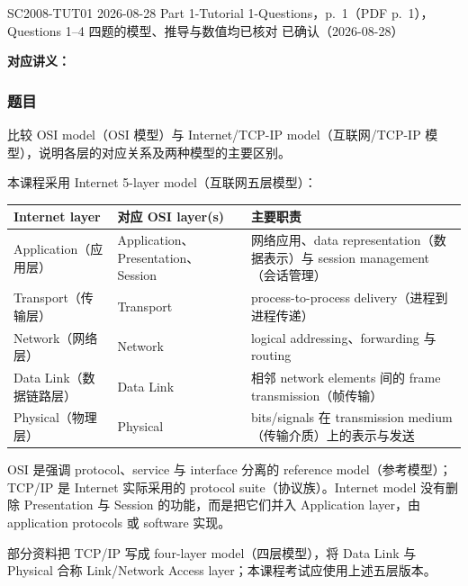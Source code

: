 
\label{tutorial:SC2008-TUT01}

\tutorialmeta
  {SC2008-TUT01}
  {2026-08-28}
  {Part 1-Tutorial 1-Questions，p.~1（PDF p.~1），Questions 1--4}
  {四题的模型、推导与数值均已核对}
  {已确认（2026-08-28）}


\textbf{对应讲义：}

\subsubsection*{题目}

比较 OSI model（OSI 模型）与 Internet/TCP-IP model（互联网/TCP-IP 模型），说明各层的对应关系及两种模型的主要区别。

\begin{checkedsolution}
本课程采用 Internet 5-layer model（互联网五层模型）：
\begin{center}
\small
\begin{tabularx}{0.94\textwidth}{@{}>{\raggedright\arraybackslash}p{3.3cm}>{\raggedright\arraybackslash}p{4.2cm}X@{}}
  \toprule
  Internet layer & 对应 OSI layer(s) & 主要职责 \\
  \midrule
  Application（应用层） & Application、Presentation、Session & 网络应用、data representation（数据表示）与 session management（会话管理） \\
  Transport（传输层） & Transport & process-to-process delivery（进程到进程传递） \\
  Network（网络层） & Network & logical addressing、forwarding 与 routing \\
  Data Link（数据链路层） & Data Link & 相邻 network elements 间的 frame transmission（帧传输） \\
  Physical（物理层） & Physical & bits/signals 在 transmission medium（传输介质）上的表示与发送 \\
  \bottomrule
\end{tabularx}
\end{center}

OSI 是强调 protocol、service 与 interface 分离的 reference model（参考模型）；TCP/IP 是 Internet 实际采用的 protocol suite（协议族）。Internet model 没有删除 Presentation 与 Session 的功能，而是把它们并入 Application layer，由 application protocols 或 software 实现。

部分资料把 TCP/IP 写成 four-layer model（四层模型），将 Data Link 与 Physical 合称 Link/Network Access layer；本课程考试应使用上述五层版本。
\end{checkedsolution}

